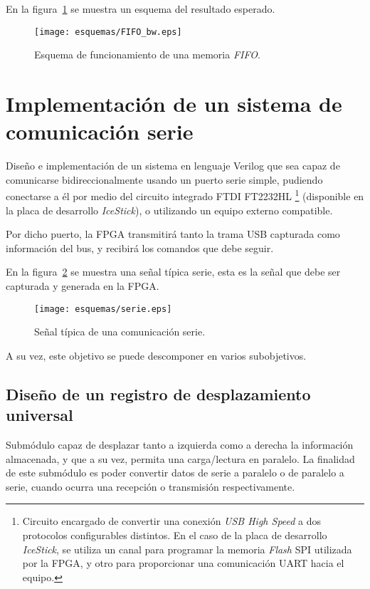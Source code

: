 En la figura~\ref{fig:FIFO_info} se muestra un esquema del resultado esperado.

\begin{figure}[htb]
    \centering
    \texttt{[image: esquemas/FIFO\_bw.eps]}
    \caption{Esquema de funcionamiento de una memoria \emph{FIFO}.}
    \label{fig:FIFO_info}
\end{figure}



\section{Implementación de un sistema de comunicación serie}
Diseño e implementación de un sistema en lenguaje Verilog que sea capaz de comunicarse bidireccionalmente usando un puerto serie simple\cite{design-uart-vhdl}, pudiendo conectarse a él por medio del circuito integrado FTDI FT2232HL \footnote{Circuito encargado de convertir una conexión \emph{USB High Speed} a dos protocolos configurables distintos. En el caso de la placa de desarrollo \emph{IceStick}, se utiliza un canal para programar la memoria \emph{Flash} SPI utilizada por la FPGA, y otro para proporcionar una comunicación UART hacia el equipo.} (disponible en la placa de desarrollo \emph{IceStick}\cite{icestickmanual}), o utilizando un equipo externo compatible.

Por dicho puerto, la FPGA transmitirá tanto la trama USB capturada como información del bus, y recibirá los comandos que debe seguir.

En la figura~\ref{fig:serie_esquema} se muestra una señal típica serie, esta es la señal que debe ser capturada y generada en la FPGA.

\begin{figure}[htb]
    \centering
    \texttt{[image: esquemas/serie.eps]}
    \caption{Señal típica de una comunicación serie.}
    \label{fig:serie_esquema}
\end{figure}

A su vez, este objetivo se puede descomponer en varios subobjetivos.
\subsection{Diseño de un registro de desplazamiento universal}
\label{ssct:registro_desplazamiento}
Submódulo capaz de desplazar tanto a izquierda como a derecha la información almacenada, y que a su vez, permita una carga/lectura en paralelo.
La finalidad de este submódulo es poder convertir datos de serie a paralelo o de paralelo a serie, cuando ocurra una recepción o transmisión respectivamente.

